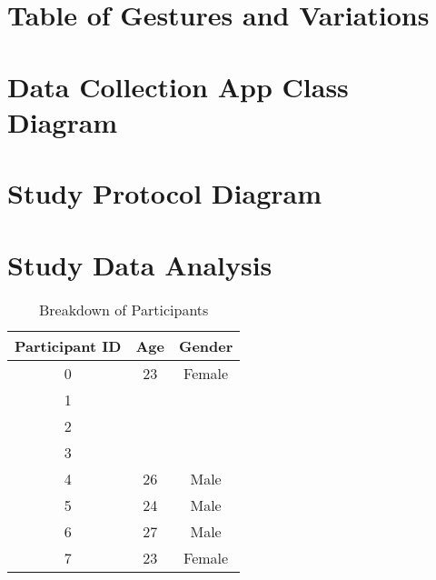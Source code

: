 \appendix

\section{Table of Gestures and Variations}\label{app:gestures}

\section{Data Collection App Class Diagram}

\section{Study Protocol Diagram}\label{app:protocol}

\section{Study Data Analysis}\label{app:study_data}
\begin{table}[H]
    \centering
    \caption{Breakdown of Participants}
    \label{tab:participant_breakdown}
    \begin{tabular}{ c | c | c }
        Participant ID & Age & Gender \\
        \hline
        0 & 23 & Female \\
        1 & & \\
        2 & & \\
        3 & & \\
        4 & 26 & Male \\
        5 & 24 & Male \\
        6 & 27 & Male \\
        7 & 23 & Female \\
        \hline
    \end{tabular}
\end{table}



